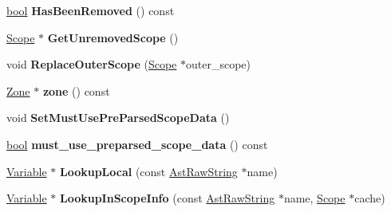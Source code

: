 \begin{DoxyCompactItemize}
\mbox{\hyperlink{classbool}{bool}} {\bfseries Has\+Been\+Removed} () const
\item 
\mbox{\label{classv8_1_1internal_1_1Scope_af1e9188c9844d6c19eac79c9cbd6c119}} 
\mbox{\hyperlink{classv8_1_1internal_1_1Scope}{Scope}} $\ast$ {\bfseries Get\+Unremoved\+Scope} ()
\item 
\mbox{\label{classv8_1_1internal_1_1Scope_ab1003489286e344c4858478f4452142b}} 
void {\bfseries Replace\+Outer\+Scope} (\mbox{\hyperlink{classv8_1_1internal_1_1Scope}{Scope}} $\ast$outer\+\_\+scope)
\item 
\mbox{\label{classv8_1_1internal_1_1Scope_aafe0b1ba059900bb7af8f20d3b6d2c4a}} 
\mbox{\hyperlink{classv8_1_1internal_1_1Zone}{Zone}} $\ast$ {\bfseries zone} () const
\item 
\mbox{\label{classv8_1_1internal_1_1Scope_a49a706dbd78fee8865c9640ef70f6ab7}} 
void {\bfseries Set\+Must\+Use\+Pre\+Parsed\+Scope\+Data} ()
\item 
\mbox{\label{classv8_1_1internal_1_1Scope_a53eb6b865cc04a90257db43343eee78b}} 
\mbox{\hyperlink{classbool}{bool}} {\bfseries must\+\_\+use\+\_\+preparsed\+\_\+scope\+\_\+data} () const
\item 
\mbox{\label{classv8_1_1internal_1_1Scope_a292a93a5239fa8d2207b232ddb733389}} 
\mbox{\hyperlink{classv8_1_1internal_1_1Variable}{Variable}} $\ast$ {\bfseries Lookup\+Local} (const \mbox{\hyperlink{classv8_1_1internal_1_1AstRawString}{Ast\+Raw\+String}} $\ast$name)
\item 
\mbox{\label{classv8_1_1internal_1_1Scope_a0691a5bce06000898d7ab736ce03a16f}} 
\mbox{\hyperlink{classv8_1_1internal_1_1Variable}{Variable}} $\ast$ {\bfseries Lookup\+In\+Scope\+Info} (const \mbox{\hyperlink{classv8_1_1internal_1_1AstRawString}{Ast\+Raw\+String}} $\ast$name, \mbox{\hyperlink{classv8_1_1internal_1_1Scope}{Scope}} $\ast$cache)
\item 
\mbox{\label{classv8_1_1internal_1_1Scope_a7c03393f46b0f36234f1dc6e6c937073}} 

\end{DoxyCompactItemize}
